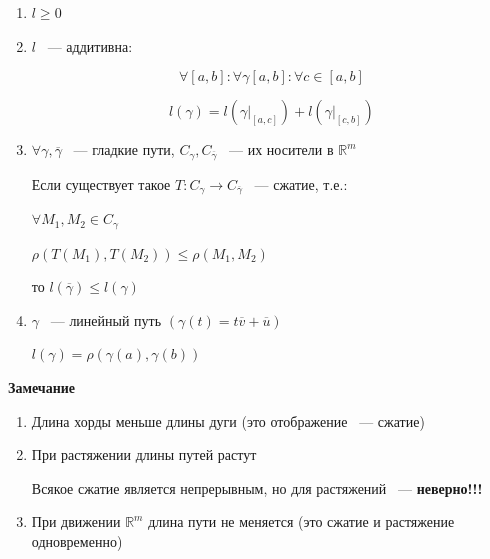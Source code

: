 \documentclass{article}
\begin{document}
        \begin{enumerate}
        
            \item $l \geq 0$
            
            \item $l$ ~--- аддитивна:
           
                $$\forall [a, b] : \forall \gamma[a, b] : \forall c \in [a, b]$$
                
                $$l(\gamma) = l\left(\gamma \bigg|_{[a, c]}\right) + l\left(\gamma \bigg|_{[c, b]}\right)$$
            
            \item $\forall \gamma{,} \overline{\gamma}$ ~--- гладкие пути, $C_{\gamma}, C_{\overline{\gamma}}$ ~--- их носители в $\mathbb{R}^m$
                
                Если существует такое $T: C_{\gamma} \rightarrow C_{\overline{\gamma}}$ ~--- сжатие, т.е.:

                    $\forall M_1{,} M_2 \in C_{\gamma}$
                    
                    $\rho \left(T\left(M_1\right), T\left(M_2\right)\right) \leq \rho \left(M_1, M_2\right)$
                
                то $l(\overline{\gamma}) \leq l(\gamma)$
                
            \item $\gamma$ ~--- линейный путь $(\gamma(t) = t \overline{v} + \overline{u})$
            
                $l(\gamma) = \rho(\gamma(a), \gamma(b))$
                
        \end{enumerate}
            
        \textbf{Замечание}
        
        \begin{enumerate}
        
            \item Длина хорды меньше длины дуги (это отображение ~--- сжатие)
            
            \item При растяжении длины путей растут
            
                Всякое сжатие является непрерывным, но для растяжений ~--- \textbf{неверно!!!}
                
            \item При движении $\mathbb{R}^m$ длина пути не меняется (это сжатие и растяжение одновременно)
            
        \end{enumerate}
        
\end{document}
